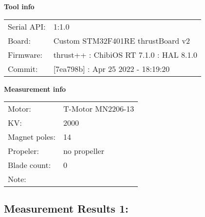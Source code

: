 \documentclass[10pt]{article}
\begin{document}
\noindent
{\large \bf Tool info}
\vspace{3mm}

\noindent
\begin{tabular}{ll}
Serial API:  & 1:1.0\\ 
Board:       & Custom STM32F401RE thrustBoard v2\\ 
Firmware:    & thrust++ : ChibiOS RT 7.1.0 : HAL 8.1.0\\ 
Commit:      & [7ea798b] : Apr 25 2022 - 18:19:20
\end{tabular}
\vspace{3mm}

\noindent
{\large \bf Measurement info}
\vspace{3mm}

\noindent
\begin{tabular}{ll}
Motor:        & T-Motor MN2206-13\\ 
KV:           & 2000\\ 
Magnet poles: & 14\\ 
Propeler:     & no propeller\\ 
Blade count:  & 0\\ 
Note:         & 
\end{tabular}

\vspace{3mm}


\subsection*{\large \bf Measurement Results 1:}
\end{document}
